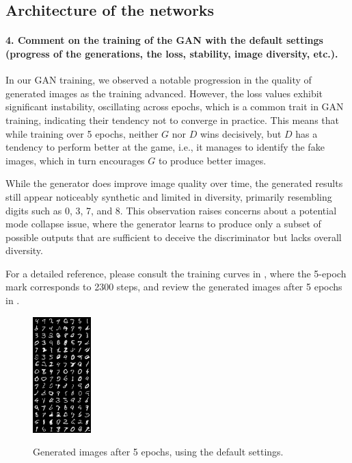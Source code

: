 \subsection{Architecture of the networks}

\paragraph*{4. Comment on the training of the GAN with the default settings (progress of the generations, the loss, stability, image diversity, etc.).}

In our GAN training, we observed a notable progression in the quality of generated images as the training advanced. However, the loss values exhibit significant instability, oscillating across epochs, which is a common trait in GAN training, indicating their tendency not to converge in practice. This means that while training over 5 epochs, neither $G$ nor $D$ wins decisively, but $D$ has a tendency to perform better at the game, i.e., it manages to identify the fake images, which in turn encourages $G$ to produce better images. 

While the generator does improve image quality over time, the generated results still appear noticeably synthetic and limited in diversity, primarily resembling digits such as 0, 3, 7, and 8. This observation raises concerns about a potential mode collapse issue, where the generator learns to produce only a subset of possible outputs that are sufficient to deceive the discriminator but lacks overall diversity.

For a detailed reference, please consult the training curves in , where the 5-epoch mark corresponds to 2300 steps, and review the generated images after 5 epochs in .

\begin{figure}[H]
    \centering
    \includegraphics[width=0.2\textwidth]{default.png}
    \label{fig:default}
    \caption{Generated images after 5 epochs, using the default settings.}
\end{figure}

